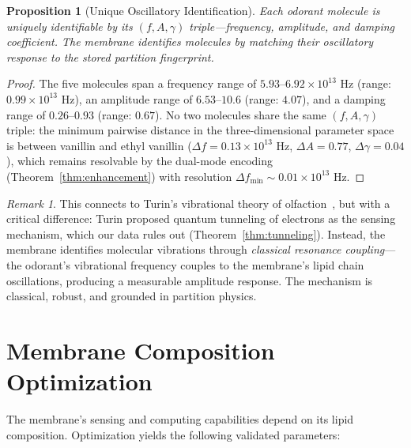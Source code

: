 \documentclass[12pt]{article}
\newtheorem{proposition}[theorem]{Proposition}
\theoremstyle{definition}
\theoremstyle{remark}
\newtheorem{remark}[theorem]{Remark}
\begin{document}
\begin{proposition}[Unique Oscillatory Identification]
\label{prop:olfactory}
Each odorant molecule is uniquely identifiable by its $(f, A, \gamma)$ triple---frequency, amplitude, and damping coefficient. The membrane identifies molecules by matching their oscillatory response to the stored partition fingerprint.
\end{proposition}

\begin{proof}
The five molecules span a frequency range of $5.93$--$6.92 \times 10^{13}$ Hz (range: $0.99 \times 10^{13}$ Hz), an amplitude range of $6.53$--$10.6$ (range: $4.07$), and a damping range of $0.26$--$0.93$ (range: $0.67$). No two molecules share the same $(f, A, \gamma)$ triple: the minimum pairwise distance in the three-dimensional parameter space is between vanillin and ethyl vanillin ($\Delta f = 0.13 \times 10^{13}$ Hz, $\Delta A = 0.77$, $\Delta \gamma = 0.04$), which remains resolvable by the dual-mode encoding (Theorem~\ref{thm:enhancement}) with resolution $\Delta f_{\mathrm{min}} \sim 0.01 \times 10^{13}$ Hz. \qedhere
\end{proof}

\begin{remark}
This connects to Turin's vibrational theory of olfaction~\citep{turin1996spectroscopic}, but with a critical difference: Turin proposed quantum tunneling of electrons as the sensing mechanism, which our data rules out (Theorem~\ref{thm:tunneling}). Instead, the membrane identifies molecular vibrations through \emph{classical resonance coupling}---the odorant's vibrational frequency couples to the membrane's lipid chain oscillations, producing a measurable amplitude response. The mechanism is classical, robust, and grounded in partition physics.
\end{remark}


\section{Membrane Composition Optimization}
\label{sec:composition}

The membrane's sensing and computing capabilities depend on its lipid composition. Optimization yields the following validated parameters:
\end{document}

